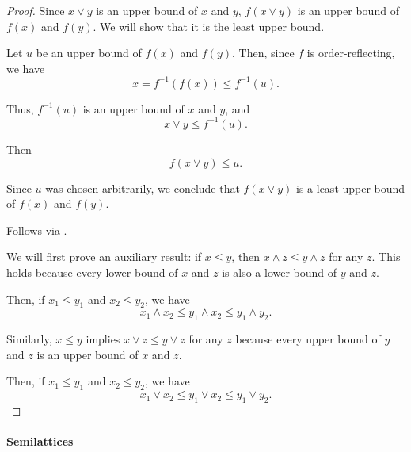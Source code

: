 \begin{proof}
   Since \( x \vee y \) is an upper bound of \( x \) and \( y \), \( f(x \vee y) \) is an upper bound of \( f(x) \) and \( f(y) \). We will show that it is the least upper bound.

  Let \( u \) be an upper bound of \( f(x) \) and \( f(y) \). Then, since \( f \) is order-reflecting, we have
  \begin{equation*}
    x = f^{-1}(f(x)) \leq f^{-1}(u).
  \end{equation*}

  Thus, \( f^{-1}(u) \) is an upper bound of \( x \) and \( y \), and
  \begin{equation*}
    x \vee y \leq f^{-1}(u).
  \end{equation*}

  Then
  \begin{equation*}
    f(x \vee y) \leq u.
  \end{equation*}

  Since \( u \) was chosen arbitrarily, we conclude that \( f(x \vee y) \) is a least upper bound of \( f(x) \) and \( f(y) \).

   Follows via .

   We will first prove an auxiliary result: if \( x \leq y \), then \( x \wedge z \leq y \wedge z \) for any \( z \). This holds because every lower bound of \( x \) and \( z \) is also a lower bound of \( y \) and \( z \).

  Then, if \( x_1 \leq y_1 \) and \( x_2 \leq y_2 \), we have
  \begin{equation*}
    x_1 \wedge x_2 \leq y_1 \wedge x_2 \leq y_1 \wedge y_2.
  \end{equation*}

  Similarly, \( x \leq y \) implies \( x \vee z \leq y \vee z \) for any \( z \) because every upper bound of \( y \) and \( z \) is an upper bound of \( x \) and \( z \).

  Then, if \( x_1 \leq y_1 \) and \( x_2 \leq y_2 \), we have
  \begin{equation*}
    x_1 \vee x_2 \leq y_1 \vee x_2 \leq y_1 \vee y_2.
  \end{equation*}
\end{proof}

\paragraph{Semilattices}

